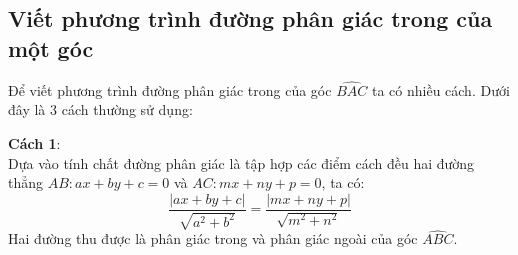 \subsection{Viết phương trình đường phân giác trong của một góc}
Để viết phương trình đường phân giác trong của góc $\widehat{BAC}$ ta có nhiều cách. Dưới đây là 3 cách thường sử dụng:\\
\begin{minipage}{0.55 \textwidth}
\textbf{Cách 1}:\\ Dựa vào tính chất đường phân giác là tập hợp các điểm cách đều hai đường thẳng $AB:ax+by+c=0$ và $AC: mx+ny+p=0$, ta có:
$$\dfrac{|ax+by+c|}{\sqrt{a^2+b^2}}=\dfrac{|mx+ny+p|}{\sqrt{m^2+n^2}}$$
Hai đường thu được là phân giác trong và phân giác ngoài của góc $\widehat{ABC}$.\\
\end{minipage}
